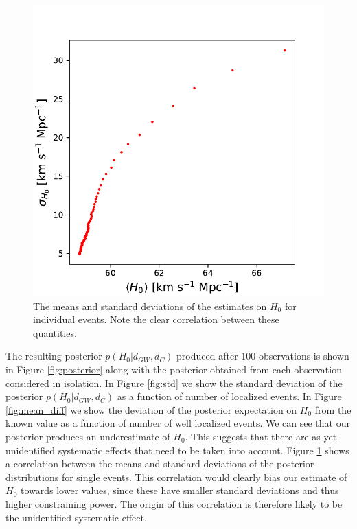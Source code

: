 \begin{figure}[b]
    \centering
    \includegraphics[width=\columnwidth]{figures/correlation.pdf}
    \caption{The means and standard deviations of the estimates on $H_0$ for individual events. Note the clear correlation between these quantities.}
    \label{fig:correlation}
\end{figure}

The resulting posterior $p(H_0 | d_{GW}, d_C)$ produced after $100$ observations is shown in Figure \ref{fig:posterior} along with the posterior obtained from each observation considered in isolation.
In Figure \ref{fig:std} we show the standard deviation of the posterior $p(H_0 | d_{GW}, d_C)$ as a function of number of localized events.
In Figure \ref{fig:mean_diff} we show the deviation of the posterior expectation on $H_0$ from the known value as a function of number of well localized events.
We can see that our posterior produces an underestimate of $H_0$.
This suggests that there are as yet unidentified systematic effects that need to be taken into account.
Figure \ref{fig:correlation} shows a correlation between the means and standard deviations of the posterior distributions for single events.
This correlation would clearly bias our estimate of $H_0$ towards lower values, since these have smaller standard deviations and thus higher constraining power.
The origin of this correlation is therefore likely to be the unidentified systematic effect.
